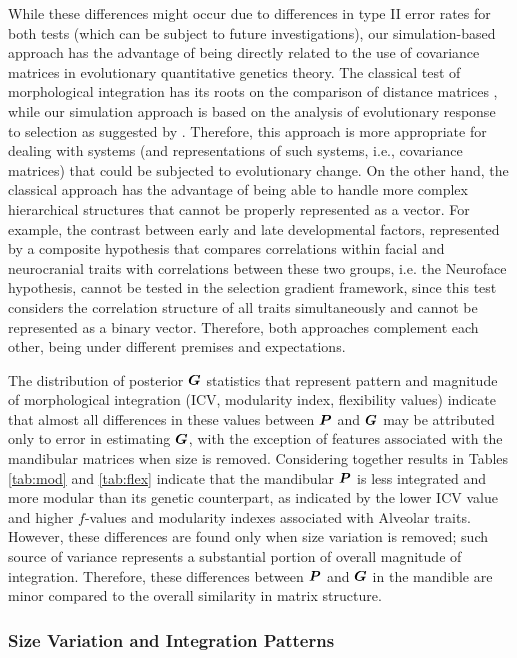 \documentclass [twocolumn, natbib, nospthms, 10pt] {svjour3}
\begin{document}
While these differences might occur due to differences in type II
error rates for both tests (which can be subject to future
investigations), our simulation-based approach has the advantage of
being directly related to the use of covariance matrices in
evolutionary quantitative genetics theory. The classical test of
morphological integration \citep{cheverud_methods_1989} has its roots
on the comparison of distance matrices \citep{mantel_detection_1967},
while our simulation approach is based on the analysis of evolutionary
response to selection as suggested by
\citet{hansen_measuring_2008}. Therefore, this approach is more
appropriate for dealing with systems (and representations of such
systems, i.e., covariance matrices) that could be subjected to
evolutionary change. On the other hand, the classical approach has the
advantage of being able to handle more complex hierarchical structures
that cannot be properly represented as a vector. For example, the
contrast between early and late developmental factors, represented by
a composite hypothesis that compares correlations within facial and
neurocranial traits with correlations between these two groups,
i.e. the Neuroface hypothesis, cannot be tested in the selection
gradient framework, since this test considers the correlation
structure of all traits simultaneously and cannot be represented as a
binary vector. Therefore, both approaches complement each other, being
under different premises and expectations.

The distribution of posterior $\boldsymbol{G}$ statistics that represent
pattern and magnitude of morphological integration (ICV, modularity
index, flexibility values) indicate that almost all differences in
these values between $\boldsymbol{P}$ and $\boldsymbol{G}$ may be attributed only to
error in estimating $\boldsymbol{G}$, with the exception of features
associated with the mandibular matrices when size is
removed. Considering together results in Tables \ref {tab:mod} and
\ref {tab:flex} indicate that the mandibular $\boldsymbol{P}$ is less
integrated and more modular than its genetic counterpart, as indicated
by the lower ICV value and higher $f$-values and modularity indexes
associated with Alveolar traits. However, these differences are found
only when size variation is removed; such source of variance
represents a substantial portion of overall magnitude of
integration. Therefore, these differences between $\boldsymbol{P}$ and
$\boldsymbol{G}$ in the mandible are minor compared to the overall similarity
in matrix structure.

\subsubsection {Size Variation and Integration Patterns}
\end{document}
